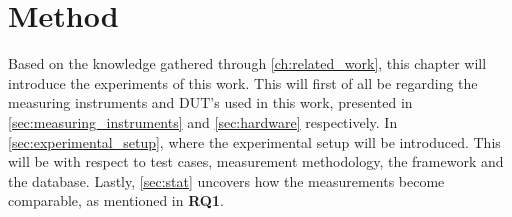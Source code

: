 \chapter{Method}\label{ch:method}

Based on the knowledge gathered through \cref{ch:related_work}, this chapter will introduce the experiments of this work. This will first of all be regarding the measuring instruments and DUT's used in this work, presented in \cref{sec:measuring_instruments} and \cref{sec:hardware} respectively. In \cref{sec:experimental_setup}, where the experimental setup will be introduced. This will be with respect to test cases, measurement methodology, the framework and the database. Lastly, \cref{sec:stat} uncovers how the measurements become comparable, as mentioned in \textbf{RQ1}.







% 
% 


